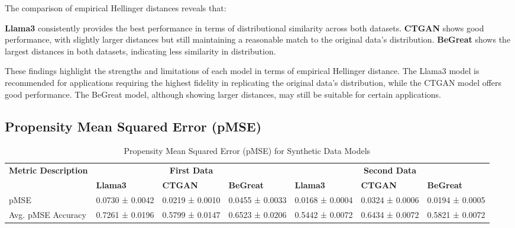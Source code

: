 \vspace{0.5cm}

The comparison of empirical Hellinger distances reveals that:

\textbf{Llama3} consistently provides the best performance in terms of distributional similarity across both datasets.
\textbf{CTGAN} shows good performance, with slightly larger distances but still maintaining a reasonable match to the original data's distribution.
\textbf{BeGreat} shows the largest distances in both datasets, indicating less similarity in distribution.

\vspace{0.5cm}

These findings highlight the strengths and limitations of each model in terms of empirical Hellinger distance. The Llama3 model is recommended for applications requiring the highest fidelity in replicating the original data's distribution, while the CTGAN model offers good performance. The BeGreat model, although showing larger distances, may still be suitable for certain applications.








\subsection{Propensity Mean Squared Error (pMSE)}


\begin{table}[H]
\centering
\caption{Propensity Mean Squared Error (pMSE) for Synthetic Data Models}
\label{tab:pmse_combined}
\begin{tabularx}{\textwidth}{l*{6}{X}}
    \toprule
    \textbf{Metric Description} & \multicolumn{3}{c}{\textbf{First Data}} & \multicolumn{3}{c}{\textbf{Second Data}} \\
    \cmidrule(lr){2-4} \cmidrule(lr){5-7}
    & \textbf{Llama3} & \textbf{CTGAN} & \textbf{BeGreat} & \textbf{Llama3} & \textbf{CTGAN} & \textbf{BeGreat} \\
    \midrule
    pMSE & 0.0730 ± 0.0042 & 0.0219 ± 0.0010 & 0.0455 ± 0.0033 & 0.0168 ± 0.0004 & 0.0324 ± 0.0006 & 0.0194 ± 0.0005 \\
    Avg. pMSE Accuracy & 0.7261 ± 0.0196 & 0.5799 ± 0.0147 & 0.6523 ± 0.0206 & 0.5442 ± 0.0072 & 0.6434 ± 0.0072 & 0.5821 ± 0.0072 \\
    \bottomrule
\end{tabularx}
\end{table}



